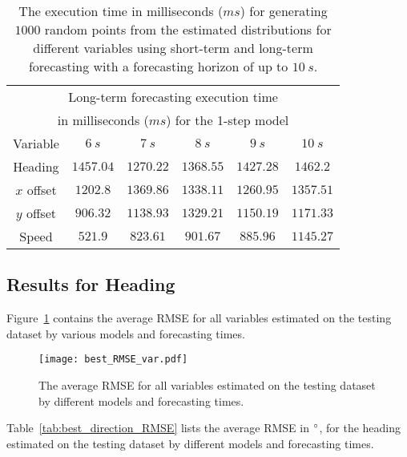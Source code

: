 \documentclass[preprint,12pt]{elsarticle}
\begin{document}
\begin{table}[!ht]
\begin{tabular}{|c|c|c|c|c|c|}
        \multicolumn{6}{|c|}{Long-term forecasting execution time} \\
        \multicolumn{6}{|c|}{in milliseconds ($ms$) for the 1-step model} \\ \hline
        Variable & $6 \ s$ & $7 \ s$ & $8 \ s$ & $9 \ s$ & $10 \ s$ \\ \hline
        Heading & $1457.04$ & $1270.22$ & $1368.55$ & $1427.28$ & $1462.2$ \\ \hline
        $x$ offset & $1202.8$ & $1369.86$ & $1338.11$ & $1260.95$ & $1357.51$ \\ \hline
        $y$ offset & $906.32$ & $1138.93$ & $1329.21$ & $1150.19$ & $1171.33$ \\ \hline
        Speed & $521.9$ & $823.61$ & $901.67$ & $885.96$ & $1145.27$ \\ \hline
    \end{tabular}
	\caption{The execution time in milliseconds ($ms$) for generating $1000$ random points from the estimated distributions for different variables using short-term and long-term forecasting with a forecasting horizon of up to $10 \ s$.}
	\label{tab:timeno}
\end{table}

\subsection{Results for Heading}

Figure~\ref{fig:best_RMSE_var} contains the average RMSE for all variables estimated on the testing dataset by various models and forecasting times.

\begin{figure}[!ht]
	\centering
	\texttt{[image: best\_RMSE\_var.pdf]}
	\caption{The average RMSE for all variables estimated on the testing dataset by different models and forecasting times.}
	\label{fig:best_RMSE_var}
\end{figure}

Table~\ref{tab:best_direction_RMSE} lists the average RMSE in $\degree$, for the heading estimated on the testing dataset by different models and forecasting times.
\end{document}
